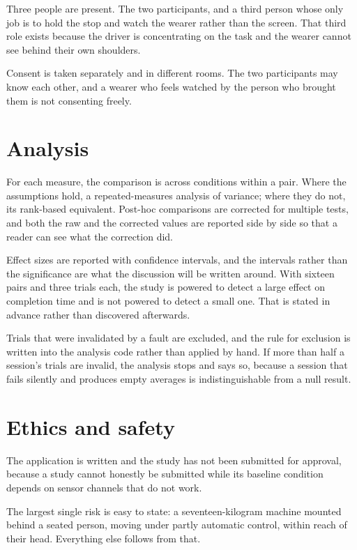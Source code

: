 Three people are present. The two participants, and a third person whose only
job is to hold the stop and watch the wearer rather than the screen. That
third role exists because the driver is concentrating on the task and the
wearer cannot see behind their own shoulders.

Consent is taken separately and in different rooms. The two participants may
know each other, and a wearer who feels watched by the person who brought them
is not consenting freely.

\section{Analysis}

For each measure, the comparison is across conditions within a pair. Where the
assumptions hold, a repeated-measures analysis of variance; where they do not,
its rank-based equivalent. Post-hoc comparisons are corrected for multiple
tests, and both the raw and the corrected values are reported side by side so
that a reader can see what the correction did.

Effect sizes are reported with confidence intervals, and the intervals rather
than the significance are what the discussion will be written around. With
sixteen pairs and three trials each, the study is powered to detect a large
effect on completion time and is not powered to detect a small one. That is
stated in advance rather than discovered afterwards.

Trials that were invalidated by a fault are excluded, and the rule for
exclusion is written into the analysis code rather than applied by hand. If
more than half a session's trials are invalid, the analysis stops and says so,
because a session that fails silently and produces empty averages is
indistinguishable from a null result.

\section{Ethics and safety}

The application is written and the study has not been submitted for approval,
because a study cannot honestly be submitted while its baseline condition
depends on sensor channels that do not work.

The largest single risk is easy to state: a seventeen-kilogram machine mounted
behind a seated person, moving under partly automatic control, within reach of
their head. Everything else follows from that.

